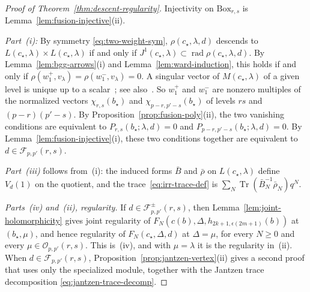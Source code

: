 \documentclass[twoside,10pt]{article}
\numberwithin{equation}{section}
\theoremstyle{slbody}
\theoremstyle{definition}
\theoremstyle{remark}
\newcommand{\Tr}{\operatorname{Tr}}
\newcommand{\rad}{\operatorname{rad}}
\begin{document}
\begin{proof}[Proof of Theorem~\ref{thm:descent-regularity}]
Injectivity on \(\mathrm{Box}_{r,s}\) is
Lemma~\ref{lem:fusion-injective}(ii).

\emph{Part~(i):} By symmetry \eqref{eq:two-weight-sym},
\(\rho(c_\star,\lambda,d)\) descends to
\(L(c_\star,\lambda)\times L(c_\star,\lambda)\) if and only if
\(J^1(c_\star,\lambda)\subset\rad\rho(c_\star,\lambda,d)\).  By
Lemma~\ref{lem:bgg-arrows}(i) and Lemma~\ref{lem:ward-induction}, this holds if and only if
\(\rho(w^+_1,v_\lambda)=\rho(w^-_1,v_\lambda)=0\).  A singular vector of
\(M(c_\star,\lambda)\) of a given level is unique up to a
scalar~\cite[Theorem~3.1]{Astashkevich1997}; see
also~\cite[Proposition~5.1]{IoharaKoga2011}.  So \(w^+_1\) and \(w^-_1\) are
nonzero multiples of the normalized vectors \(\chi_{r,s}(b_\star)\) and
\(\chi_{p-r,p'-s}(b_\star)\) of levels \(rs\) and \((p-r)(p'-s)\).  By
Proposition~\ref{prop:fusion-poly}(ii), the two vanishing conditions are
equivalent to \(P_{r,s}(b_\star;\lambda,d)=0\) and
\(P_{p-r,p'-s}(b_\star;\lambda,d)=0\).  By
Lemma~\ref{lem:fusion-injective}(i), these two conditions together are
equivalent to \(d\in\mathcal{F}_{p,p'}(r,s)\).

\emph{Part~(iii)} follows from~(i): the induced forms \(\bar B\) and
\(\bar\rho\) on \(L(c_\star,\lambda)\) define \(V_d(1)\) on the quotient, and
the trace~\eqref{eq:irr-trace-def} is
\(\sum_N\Tr(\bar B_N^{-1}\bar\rho_N)q^N\).

\emph{Parts~(iv) and~(ii), regularity.}  If
\(d\in\mathcal{F}^\pm_{p,p'}(r,s)\), then Lemma~\ref{lem:joint-holomorphicity}
gives joint regularity of \(F_N(c(b),\Delta,h_{2k+1,\epsilon(2m+1)}(b))\) at
\((b_\star,\mu)\), and hence regularity of \(F_N(c_\star,\Delta,d)\) at
\(\Delta=\mu\), for every \(N\geq0\) and every
\(\mu\in\mathcal{O}_{p,p'}(r,s)\).  This is~(iv), and with \(\mu=\lambda\) it
is the regularity in~(ii).  When \(d\in\mathcal{F}_{p,p'}(r,s)\),
Proposition~\ref{prop:jantzen-vertex}(ii) gives a second proof that uses only
the specialized module,
together with the Jantzen trace decomposition \eqref{eq:jantzen-trace-decomp}.


\end{proof}
\end{document}

